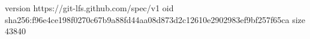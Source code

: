 version https://git-lfs.github.com/spec/v1
oid sha256:f96e4ce198f0270c67b9a88fd44aa08d873d2c12610e2902983ef9bf257f65ca
size 43840
